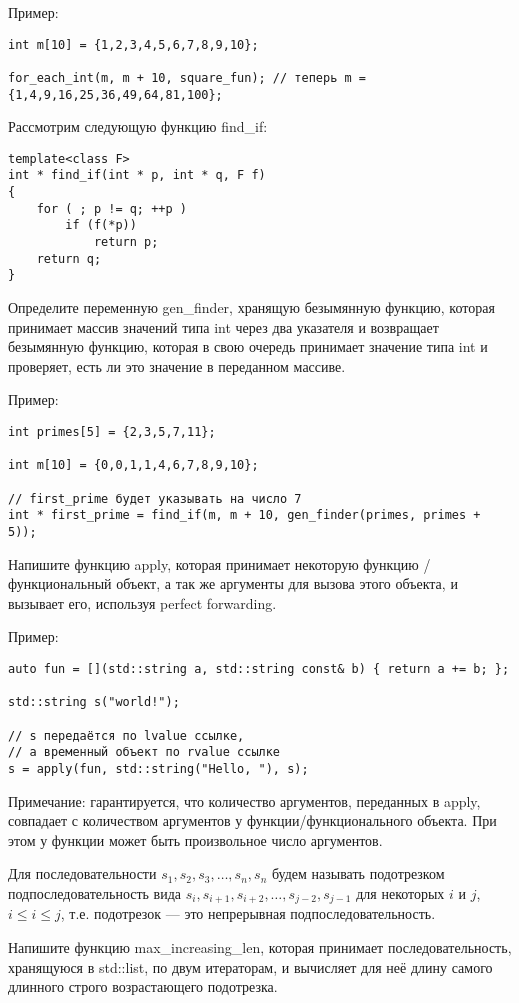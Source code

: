 \documentclass[]{article}
\begin{document}
Пример:
\begin{verbatim}
int m[10] = {1,2,3,4,5,6,7,8,9,10};

for_each_int(m, m + 10, square_fun); // теперь m = {1,4,9,16,25,36,49,64,81,100};
\end{verbatim}
Рассмотрим следующую функцию find\_if:
\begin{verbatim}
template<class F>
int * find_if(int * p, int * q, F f)
{
    for ( ; p != q; ++p )
        if (f(*p))
            return p;
    return q;
}
\end{verbatim}
Определите переменную gen\_finder, хранящую безымянную функцию, которая принимает массив значений типа int через два указателя и возвращает безымянную функцию, которая в свою очередь принимает значение типа int и проверяет, есть ли это значение в переданном массиве.

Пример:
\begin{verbatim}
int primes[5] = {2,3,5,7,11};

int m[10] = {0,0,1,1,4,6,7,8,9,10};

// first_prime будет указывать на число 7
int * first_prime = find_if(m, m + 10, gen_finder(primes, primes + 5));
\end{verbatim}




Напишите функцию apply, которая принимает некоторую функцию / функциональный объект, а так же аргументы для вызова этого объекта, и вызывает его, используя perfect forwarding.

Пример:
\begin{verbatim}
auto fun = [](std::string a, std::string const& b) { return a += b; };

std::string s("world!");

// s передаётся по lvalue ссылке,
// а временный объект по rvalue ссылке 
s = apply(fun, std::string("Hello, "), s);
\end{verbatim}
Примечание: гарантируется, что количество аргументов, переданных в apply, совпадает с количеством аргументов у функции/функционального объекта. При этом у функции может быть произвольное число аргументов.


Для последовательности $s_{1},s_{2},s_{3},\dots,s_{n},s_n $ будем называть подотрезком подпоследовательность вида 
$s_i,s_{i+1},s_{i+2},\dots,s_{j-2},s_{j-1}$ для некоторых $i$ и $j$, $i\le i\le j $, 
т.е. подотрезок — это непрерывная подпоследовательность.

Напишите функцию max\_increasing\_len, которая принимает последовательность, хранящуюся в std::list, по двум итераторам, и вычисляет для неё длину самого длинного строго возрастающего подотрезка.
\end{document}
